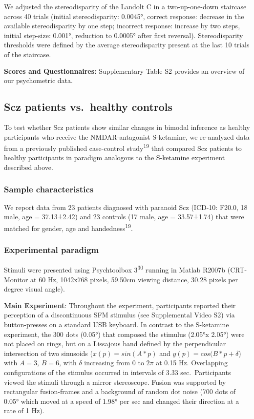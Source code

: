 \documentclass[
]{article}
\begin{document}
We adjusted the stereodisparity of the Landolt C in a two-up-one-down
staircase across 40 trials (initial stereodisparity: 0.0045°, correct
response: decrease in the available stereodisparity by one step;
incorrect response: increase by two steps, initial step-size: 0.001°,
reduction to 0.0005° after first reversal). Stereodisparity thresholds
were defined by the average stereodisparity present at the last 10
trials of the staircase.

\textbf{Scores and Questionnaires:} Supplementary Table S2 provides an
overview of our psychometric data.

\hypertarget{scz-patients-vs.-healthy-controls}{%
\subsection{Scz patients vs.~healthy
controls}\label{scz-patients-vs.-healthy-controls}}

To test whether Scz patients show similar changes in bimodal inference
as healthy participants who receive the NMDAR-antagonist S-ketamine, we
re-analyzed data from a previously published case-control
study\textsuperscript{19} that compared Scz patients to healthy
participants in paradigm analogous to the S-ketamine experiment
described above.

\hypertarget{sample-characteristics-1}{%
\subsubsection{Sample characteristics}\label{sample-characteristics-1}}

We report data from 23 patients diagnosed with paranoid Scz (ICD-10:
F20.0, 18 male, age = 37.13±2.42) and 23 controls (17 male, age =
33.57±1.74) that were matched for gender, age and
handedness\textsuperscript{19}.

\hypertarget{experimental-paradigm-1}{%
\subsubsection{Experimental paradigm}\label{experimental-paradigm-1}}

Stimuli were presented using Psychtoolbox 3\textsuperscript{30} running
in Matlab R2007b (CRT-Monitor at 60 Hz, 1042x768 pixels, 59.50cm viewing
distance, 30.28 pixels per degree visual angle).

\textbf{Main Experiment}: Throughout the experiment, participants
reported their perception of a discontinuous SFM stimulus (see
Supplemental Video S2) via button-presses on a standard USB keyboard. In
contrast to the S-ketamine experiment, the 300 dots (0.05°) that
composed the stimulus (2.05°x 2.05°) were not placed on rings, but on a
Lissajous band defined by the perpendicular intersection of two
sinusoids (\(x(p) = sin(A*p)\) and \(y(p) = cos(B*p + \delta\)) with
\(A=3\), \(B=6\), with \(\delta\) increasing from \(0\) to \(2\pi\) at
0.15 Hz. Overlapping configurations of the stimulus occurred in
intervals of 3.33 sec.~Participants viewed the stimuli through a mirror
stereoscope. Fusion was supported by rectangular fusion-frames and a
background of random dot noise (700 dots of 0.05° which moved at a speed
of 1.98° per sec and changed their direction at a rate of 1 Hz).
\end{document}

